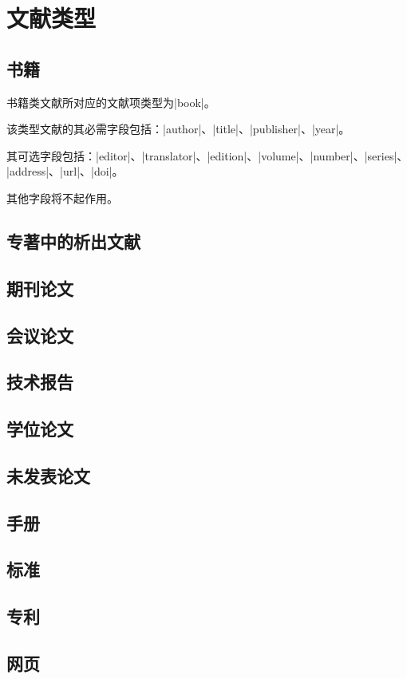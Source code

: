 \section{文献类型}\label{sec:bib-type}

\subsection{书籍}

书籍类文献所对应的{\BibTeX}文献项类型为|book|。

该类型文献的其必需字段包括：|author|、|title|、|publisher|、|year|。

其可选字段包括：|editor|、|translator|、|edition|、|volume|、|number|、|series|、
|address|、|url|、|doi|。

其他字段将不起作用。

\subsection{专著中的析出文献}

\subsection{期刊论文}

\subsection{会议论文}

\subsection{技术报告}

\subsection{学位论文}

\subsection{未发表论文}

\subsection{手册}

\subsection{标准}

\subsection{专利}

\subsection{网页}

